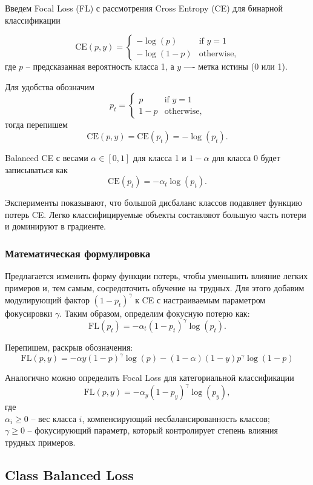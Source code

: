 Введем Focal Loss (FL) с рассмотрения Cross Entropy (CE) для бинарной классификации

\[
    \text{CE}(p, y) = \begin{cases}
        -\log(p)   & \text{if } y=1    \\
        -\log(1-p) & \text{otherwise,}
    \end{cases}
\]
где $p$ -- предсказанная вероятность класса 1, а $y$ —- метка истины (0 или 1).

Для удобства обозначим
\[
    p_t = \begin{cases}
        p   & \text{if } y=1    \\
        1-p & \text{otherwise,}
    \end{cases}
\]
тогда перепишем
\[
    \text{CE}(p, y) = \text{CE}(p_t) = -\log(p_t).
\]

Balanced CE с весами $\alpha\in[0,1]$ для класса 1 и $1-\alpha$ для класса 0 будет записываться как
\[
    \text{CE}(p_t) = -\alpha_t\log(p_t).
\]

Эксперименты показывают, что большой дисбаланс классов подавляет функцию потерь CE. Легко классифицируемые объекты составляют большую часть потери и доминируют в градиенте.

\subsubsection*{Математическая формулировка}

Предлагается изменить форму функции потерь, чтобы уменьшить влияние легких примеров и, тем самым, сосредоточить обучение на трудных. Для этого добавим модулирующий фактор $(1-p_t)^\gamma$ к CE с настраиваемым параметром фокусировки $\gamma$. Таким образом, определим фокусную потерю как:
\[
    \text{FL}(p_t)=-\alpha_t(1-p_t)^\gamma\log(p_t).
\]

Перепишем, раскрыв обозначения:
\[
    \text{FL}(p, y) = -\alpha y(1 - p)^{\gamma} \log(p) - (1 - \alpha)(1 - y) p^{\gamma} \log(1 - p)
\]

Аналогично можно определить Focal Loss для категориальной классификации
\[
    \text{FL}(p,y)=-\alpha_y (1-p_y)^\gamma\log(p_y),
\]
где
\\\indent $\alpha_i \ge 0$ -- вес класса $i$, компенсирующий несбалансированность классов;
\\\indent $\gamma \ge 0$ -- фокусирующий параметр, который контролирует степень влияния трудных примеров.

\subsection*{Class Balanced Loss}

